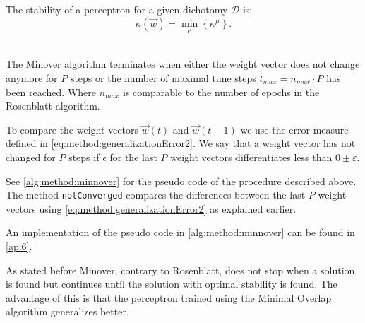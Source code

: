 The stability of a perceptron for a given dichotomy $\mathcal{D}$ is:
	\begin{equation}
		\kappa(\vec{w}) = \min_{\mu} \left\{ \kappa^\mu \right\}.
	\end{equation}

~\\The Minover algorithm terminates when either the weight vector does not change anymore for $P$ steps or the number of maximal time steps $t_{max} = n_{max} \cdot P$ has been reached. Where $n_{max}$ is comparable to the number of epochs in the Rosenblatt algorithm. 

To compare the weight vectors $\vec{w}(t)$ and $\vec{w}(t - 1)$ we use the error measure defined in \eqref{eq:method:generalizationError2}. We say that a weight vector has not changed for $P$ steps if $\epsilon$ for the last $P$ weight vectors differentiates less than $0 \pm \varepsilon$.

See \autoref{alg:method:minnover} for the pseudo code of the procedure described above. The method \texttt{notConverged} compares the differences between the last $P$ weight vectors using \eqref{eq:method:generalizationError2} as explained earlier.



An implementation of the pseudo code in \autoref{alg:method:minnover} can be found in \cref{ap:6}.

As stated before Minover, contrary to Rosenblatt, does not stop when a solution is found but continues until the solution with optimal stability is found. The advantage of this is that the perceptron trained using the Minimal Overlap algorithm generalizes better. 

